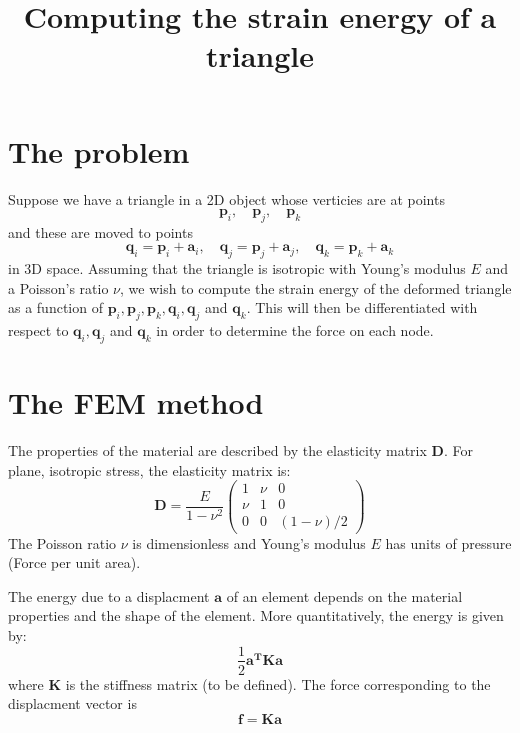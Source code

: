 \documentclass{article}
\title{Computing the strain energy of a triangle}
\renewcommand{\vec}[1]{\mathbf{#1}}
\begin{document}
\section{The problem}
\label{fem:sec:problem}

Suppose we have a triangle in a 2D object whose verticies are at
points
\begin{displaymath}
  \vec{p}_i,\quad
  \vec{p}_j,\quad
  \vec{p}_k
\end{displaymath}
and these are moved to points 
\begin{displaymath}
  \vec{q}_i=\vec{p}_i+\vec{a}_i,\quad
  \vec{q}_j=\vec{p}_j+\vec{a}_j,\quad
  \vec{q}_k=\vec{p}_k+\vec{a}_k
\end{displaymath}
in 3D space.  Assuming that the triangle is isotropic with Young's
modulus $E$ and a Poisson's ratio $\nu$, we wish to compute the strain
energy of the deformed triangle as a function of $\vec{p}_i,
\vec{p}_j, \vec{p}_k, \vec{q}_i, \vec{q}_j$ and $\vec{q}_k$. This will
then be differentiated with respect to $\vec{q}_i, \vec{q}_j$ and
$\vec{q}_k$ in order to determine the force on each node.

\section{The FEM method}
\label{fem2:sec:fem-method}

The properties of the material are described by the elasticity matrix
$\vec{D}$. For plane, isotropic stress, the elasticity matrix is:
\begin{displaymath}
  \vec{D} = \frac{E}{1-\nu^2}
  \begin{pmatrix}
    1 & \nu & 0 \\
    \nu & 1 & 0 \\
    0   & 0 & (1-\nu)/2
  \end{pmatrix}
\end{displaymath}
The Poisson ratio $\nu$ is dimensionless and Young's modulus $E$ has
units of pressure (Force per unit area).

The energy due to a displacment $\vec{a}$ of an element depends on the
material properties and the shape of the element. More quantitatively,
the energy is given by:
\begin{displaymath}
  \frac{1}{2}\vec{a^T}\vec{K}\vec{a}
\end{displaymath}
where $\vec{K}$ is the stiffness matrix (to be defined). The force
corresponding to the displacment vector is
\begin{displaymath}
  \vec{f} = \vec{K}\vec{a}  
\end{displaymath}
\end{document}
